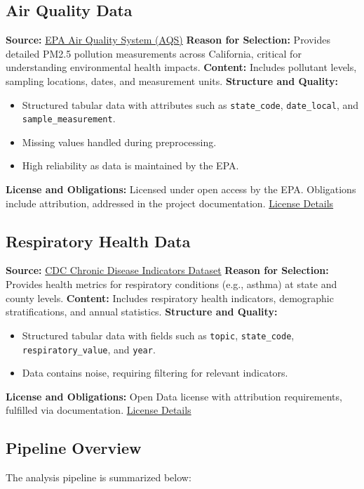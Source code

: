 \documentclass[11pt]{article}
\begin{document}
\subsection*{Air Quality Data}
\textbf{Source:} \href{https://aqs.epa.gov/aqsweb/documents/data_api.html}{EPA Air Quality System (AQS)}  
\textbf{Reason for Selection:} Provides detailed PM2.5 pollution measurements across California, critical for understanding environmental health impacts.  
\textbf{Content:} Includes pollutant levels, sampling locations, dates, and measurement units.  
\textbf{Structure and Quality:}
\begin{itemize}
    \item Structured tabular data with attributes such as \texttt{state\_code}, \texttt{date\_local}, and \texttt{sample\_measurement}.
    \item Missing values handled during preprocessing.
    \item High reliability as data is maintained by the EPA.
\end{itemize}
\textbf{License and Obligations:}  
Licensed under open access by the EPA. Obligations include attribution, addressed in the project documentation.  
\href{https://data.gov/open-gov/}{License Details}

\subsection*{Respiratory Health Data}
\textbf{Source:} \href{https://data.cdc.gov/Chronic-Disease-Indicators/U-S-Chronic-Disease-Indicators/hksd-2xuw}{CDC Chronic Disease Indicators Dataset}  
\textbf{Reason for Selection:} Provides health metrics for respiratory conditions (e.g., asthma) at state and county levels.  
\textbf{Content:} Includes respiratory health indicators, demographic stratifications, and annual statistics.  
\textbf{Structure and Quality:}
\begin{itemize}
    \item Structured tabular data with fields such as \texttt{topic}, \texttt{state\_code}, \texttt{respiratory\_value}, and \texttt{year}.
    \item Data contains noise, requiring filtering for relevant indicators.
\end{itemize}
\textbf{License and Obligations:}  
Open Data license with attribution requirements, fulfilled via documentation.  
\href{https://opendatacommons.org/licenses/odbl/1-0/}{License Details}

\subsection*{Pipeline Overview}
The analysis pipeline is summarized below:
\end{document}
